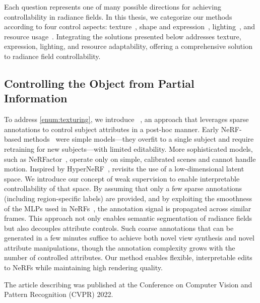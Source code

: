   Each question represents one of many possible directions for achieving
  controllability in radiance fields.
  In this thesis, we categorize our methods according to four control aspects:
  texture~\cite{kania2022conerf,kania2023blendfields}, shape and
  expression~\cite{kania2023blendfields}, lighting~\cite{kaleta2024lumigauss},
  and resource usage~\cite{kania2024clog}.
  Integrating the solutions presented below addresses texture, expression,
  lighting, and resource adaptability, offering a comprehensive solution to
  radiance field controllability.

  \subsection{Controlling the Object from Partial Information}
    To address \ref{enum:texturing}, we introduce \conerf~\cite{kania2022conerf},
    an approach that leverages sparse annotations to control subject attributes in
    a post-hoc manner.
    Early NeRF-based methods~\cite{liu2021editing} were simple models---they
    overfit to a single subject and require retraining for new subjects—with
    limited editability.
    More sophisticated models, such as NeRFactor~\cite{zhang2021nerfactor},
    operate only on simple, calibrated scenes and cannot handle motion.
    Inspired by HyperNeRF~\cite{park2021hypernerf}, \conerf revisits the use of a
    low-dimensional latent space.
    We introduce our concept of weak supervision to enable interpretable
    controllability of that space.
    By assuming that only a few sparse annotations (including region-specific
    labels) are provided, and by exploiting the smoothness of the MLPs used in
    NeRFs~\cite{tancik2020fourier}, the annotation signal is propagated across
    similar frames.
    This approach not only enables semantic segmentation of radiance fields but
    also decouples attribute controls.
    Such coarse annotations that can be generated in a few minutes suffice to
    achieve both novel view synthesis and novel attribute manipulations, though
    the annotation complexity grows with the number of controlled attributes.
    Our method enables flexible, interpretable edits to NeRFs while maintaining
    high rendering quality.

    The article describing \conerf was published at the Conference on Computer
    Vision and Pattern Recognition (CVPR) 2022.

